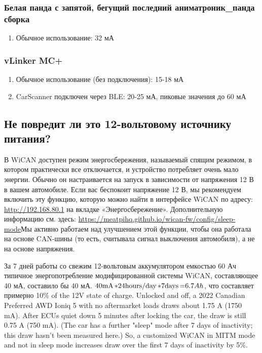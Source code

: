 \documentclass[superscriptaddress,onecolumn,floatfix]{revtex4-2}
\begin{document}
\subsubsection{Белая панда с запятой, бегущий последний аниматроник\_панда сборка}
\begin{enumerate}
  \item{Обычное использование:} 32 мА
\end{enumerate}

\subsubsection{vLinker MC+}
\begin{enumerate}
  \item{Обычное использование (без подключения):} 15-18 мА
  \item{CarScanner подключен через BLE:} 20-25 мА, пиковые значения до 60 мА
\end{enumerate}

\subsection{Не повредит ли это 12-вольтовому источнику питания?}

В WiCAN доступен режим энергосбережения, называемый спящим режимом, в котором практически все отключается, и устройство потребляет очень мало энергии. Обычно он настраивается на запуск в зависимости от напряжения 12 В в вашем автомобиле. Если вас беспокоит напряжение 12 В, мы рекомендуем включить эту функцию, которую можно найти в интерфейсе WiCAN по адресу: \href{http://192.168.80.1}{http://192.168.80.1} на вкладке «Энергосбережение». Дополнительную информацию см. здесь: \href{https://meatpihq.github.io/wican-fw/config/sleep-mode}{https://meatpihq.github.io/wican-fw/config/sleep-mode}Мы активно работаем над улучшением этой функции, чтобы она работала на основе CAN-шины (то есть, считывала сигнал выключения автомобиля), а не на основе напряжения. 

За 7 дней работы со свежим 12-вольтовым аккумулятором емкостью 60 Ач типичное энергопотребление модифицированной системы WiCAN, составляющее 40 мА, составило бы 40 мА. $40 \unit[\mathrm{mA}] * 24 \unit[\mathrm{hours/day}] * 7 \unit[\mathrm{days}] = 6.7 Ah$, что составляет примерно 10\% of the 12V state of charge. Unlocked and off, a 2022 Canadian Preferred AWD Ioniq 5 with no aftermarket loads draws about 1.75 A (1750 mA). After ECUs quiet down 5 minutes after locking the car, the draw is still 0.75 A (750 mA). (The car has a further "sleep" mode after 7 days of inactivity; this draw hasn't been measured here.) So, a customized WiCAN in MITM mode and not in sleep mode increases draw over the first 7 days of inactivity by 5\%.
\end{document}
